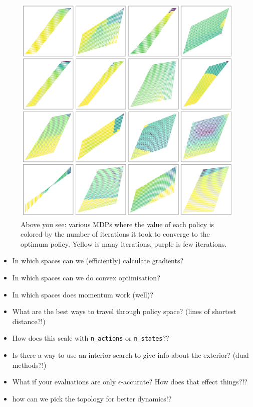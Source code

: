 \begin{figure}[!h]
\centering
\includegraphics[width=1\textwidth,height=1\textheight]{../../pictures/figures/mvi-iterations.png}
\caption{Above you see: various MDPs where the value of each policy is colored
by the number of iterations it took to converge to the optimum policy. Yellow is many iterations, purple is few iterations.}
\end{figure}

\begin{itemize}
\tightlist
\item In which spaces can we (efficiently) calculate gradients?
\item In which spaces can we do convex optimisation?
\item In which spaces does momentum work (well)?
\end{itemize}


\begin{itemize}
\tightlist
\item
  What are the best ways to travel through policy space? (lines of
  shortest distance?!)
\item
  How does this scale with \texttt{n\_actions} or \texttt{n\_states}??
\item
  Is there a way to use an interior search to give info about the
  exterior? (dual methods?!)
\item
  What if your evaluations are only \(\epsilon\)-accurate? How does that
  effect things?!?
\item
  how can we pick the topology for better dynamics!?
\end{itemize}

